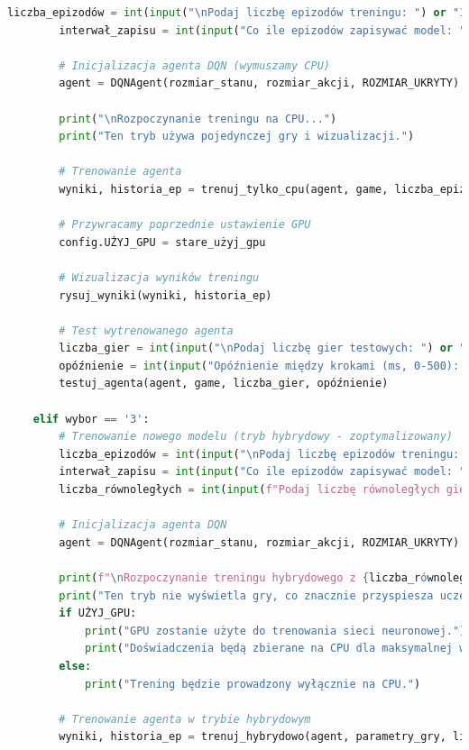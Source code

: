 \documentclass[a4paper,12pt]{article}
\begin{document}
\begin{lstlisting}[language=Python]
        liczba_epizodów = int(input("\nPodaj liczbę epizodów treningu: ") or "1000")
        interwał_zapisu = int(input("Co ile epizodów zapisywać model: ") or "100")
        
        # Inicjalizacja agenta DQN (wymuszamy CPU)
        agent = DQNAgent(rozmiar_stanu, rozmiar_akcji, ROZMIAR_UKRYTY)
        
        print("\nRozpoczynanie treningu na CPU...")
        print("Ten tryb używa pojedynczej gry i wizualizacji.")
        
        # Trenowanie agenta
        wyniki, historia_ep = trenuj_tylko_cpu(agent, game, liczba_epizodów, interwał_zapisu=interwał_zapisu)
        
        # Przywracamy poprzednie ustawienie GPU
        config.UŻYJ_GPU = stare_użyj_gpu
        
        # Wizualizacja wyników treningu
        rysuj_wyniki(wyniki, historia_ep)
        
        # Test wytrenowanego agenta
        liczba_gier = int(input("\nPodaj liczbę gier testowych: ") or "5")
        opóźnienie = int(input("Opóźnienie między krokami (ms, 0-500): ") or "100")
        testuj_agenta(agent, game, liczba_gier, opóźnienie)
    
    elif wybor == '3':
        # Trenowanie nowego modelu (tryb hybrydowy - zoptymalizowany)
        liczba_epizodów = int(input("\nPodaj liczbę epizodów treningu: ") or "1000")
        interwał_zapisu = int(input("Co ile epizodów zapisywać model: ") or "100")
        liczba_równoległych = int(input(f"Podaj liczbę równoległych gier (zalecane: {LICZBA_WĄTKÓW_CPU}-16): ") or str(LICZBA_WĄTKÓW_CPU))
        
        # Inicjalizacja agenta DQN
        agent = DQNAgent(rozmiar_stanu, rozmiar_akcji, ROZMIAR_UKRYTY)
        
        print(f"\nRozpoczynanie treningu hybrydowego z {liczba_równoległych} równoległymi grami...")
        print("Ten tryb nie wyświetla gry, co znacznie przyspiesza uczenie.")
        if UŻYJ_GPU:
            print("GPU zostanie użyte do trenowania sieci neuronowej.")
            print("Doświadczenia będą zbierane na CPU dla maksymalnej wydajności.")
        else:
            print("Trening będzie prowadzony wyłącznie na CPU.")
        
        # Trenowanie agenta w trybie hybrydowym
        wyniki, historia_ep = trenuj_hybrydowo(agent, parametry_gry, liczba_epizodów, interwał_zapisu=interwał_zapisu, liczba_równoległych=liczba_równoległych)
        

\end{lstlisting}
\end{document}
